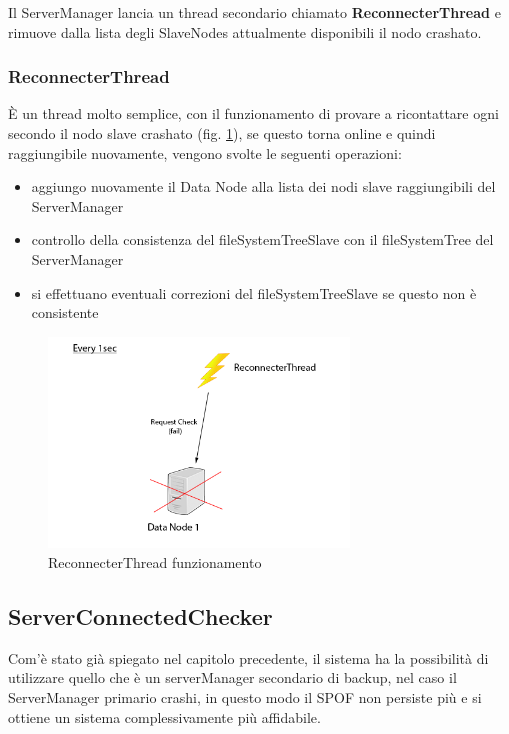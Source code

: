 \documentclass[]{article}
\begin{document}
\vspace{0.5cm}

Il ServerManager lancia un thread secondario chiamato \textbf{ReconnecterThread} e rimuove dalla lista degli SlaveNodes attualmente disponibili il nodo crashato.


\subsubsection{ReconnecterThread}

È un thread molto semplice, con il funzionamento di provare a ricontattare ogni secondo il nodo slave crashato (fig. \ref{fig:ReconnecterThread}), se questo torna online e quindi raggiungibile nuovamente, vengono svolte le seguenti operazioni:

\begin{itemize}
	\item aggiungo nuovamente il Data Node alla lista dei nodi slave raggiungibili del ServerManager
	\item controllo della consistenza del fileSystemTreeSlave con il fileSystemTree del ServerManager
	\item si effettuano eventuali correzioni del fileSystemTreeSlave se questo non è consistente
\end{itemize}


\begin{figure}
	\centering
	\includegraphics[width=8cm]{../Img/ReconnecterThread.png}
	\caption[]{ReconnecterThread funzionamento}
	\label{fig:ReconnecterThread}
	
\end{figure}



\subsection{ServerConnectedChecker}

Com'è stato già spiegato nel capitolo precedente, il sistema ha la possibilità di utilizzare quello che è un serverManager secondario di backup, nel caso il ServerManager primario crashi, in questo modo il SPOF non persiste più e si ottiene un sistema complessivamente più affidabile.
\end{document}
